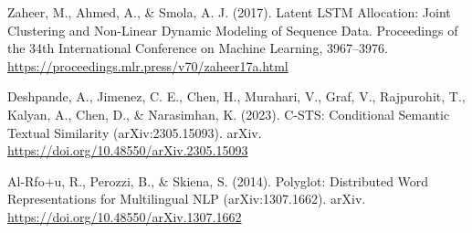 \documentclass[UTF8]{ctexart}
\begin{document}
\begin{thebibliography}{99}
     Zaheer, M., Ahmed, A., \& Smola, A. J. (2017). Latent LSTM Allocation: Joint Clustering and Non-Linear Dynamic Modeling of Sequence Data. Proceedings of the 34th International Conference on Machine Learning, 3967–3976. \url{https://proceedings.mlr.press/v70/zaheer17a.html}

     Deshpande, A., Jimenez, C. E., Chen, H., Murahari, V., Graf, V., Rajpurohit, T., Kalyan, A., Chen, D., \& Narasimhan, K. (2023). C-STS: Conditional Semantic Textual Similarity (arXiv:2305.15093). arXiv. \url{https://doi.org/10.48550/arXiv.2305.15093}

     Al-Rfo+u, R., Perozzi, B., \& Skiena, S. (2014). Polyglot: Distributed Word Representations for Multilingual NLP (arXiv:1307.1662). arXiv. \url{https://doi.org/10.48550/arXiv.1307.1662}

\end{thebibliography}
\end{document}
